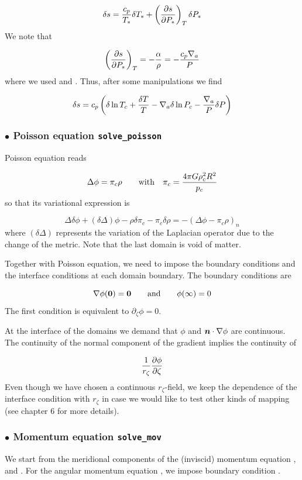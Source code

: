 \[ \delta s = \frac{c_p}{T_*}\delta T_* + \left(\frac{\partial s}{\partial
P_*}\right)_T\delta P_*\]
We note that

\[ \left(\frac{\partial s}{\partial
P_*}\right)_T = -\frac{\alpha}{\rho} = -\frac{c_p\nabla_a}{P}\]
where we used  and .
Thus, after some manipulations we find

\[ \delta s = c_p\left(\delta\ln T_c + \frac{\delta T}{T} - \nabla_a\delta\ln P_c
-\frac{\nabla_a}{P}\delta P \right)\]

\subsubsection{$\bullet$ \bf Poisson equation {\tt solve\_poisson}}

Poisson equation reads

\[ \Delta \phi = \pi_c \rho \qquad {\rm with}\quad  \pi_c = \frac{4 \pi G
\rho_c^2 R^2}{p_c}\]
so that its variational expression is 

\[ \Delta \delta\phi +(\delta\Delta)\phi - \rho\delta\pi_c  -
\pi_c\delta\rho = -(\Delta \phi - \pi_c \rho)_n \]
where $(\delta\Delta)$ represents the variation of the Laplacian operator due
to the change of the metric. Note that the last domain is void of matter.

Together with Poisson equation, we need to impose the boundary conditions and
the interface conditions at each domain boundary. The boundary conditions are

\[ \na\phi(\vzero) = \vzero  \andet \phi(\infty) = 0\]
The first condition is equivalent to $\partial_\zeta\phi=0$.

At the interface of the domains we demand that $\phi$ and $\vn\cdot\na\phi$
are continuous. The continuity of the normal component of the gradient implies
the continuity of

\[ \frac{1}{r_\zeta}\frac{\partial \phi}{\partial \zeta}\]
Even though we have chosen a continuous $r_\zeta$-field, we keep the
dependence of the interface condition with $r_\zeta$ in case we would like to
test other kinds of mapping (see chapter 6 for more details).

\subsubsection{$\bullet$ \bf Momentum equation {\tt solve\_mov}}

We start from the meridional components of the (inviscid) momentum equation
,  and . For the angular momentum
equation , we impose boundary condition .

